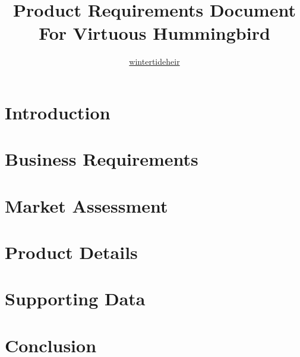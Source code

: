 \documentclass{article}
\title{Product Requirements Document \\ \vspace{1mm} \normalsize For Virtuous Hummingbird}
\author{\href{https://github.com/wintertideheir}{wintertideheir}}
\date{}
\begin{document}
\maketitle
\tableofcontents

\section{Introduction}
\section{Business Requirements}
\section{Market Assessment}
\section{Product Details}
\section{Supporting Data}
\section{Conclusion}
\end{document}
